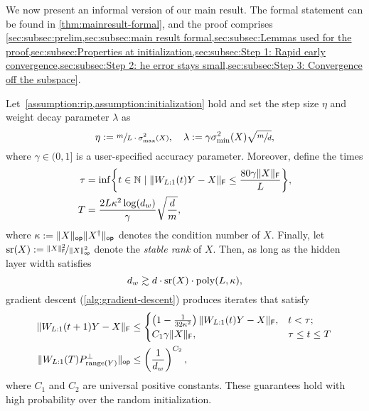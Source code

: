 We now present an informal version of our main result. The formal statement can be found in \cref{thm:mainresult-formal}, and the proof comprises \cref{sec:subsec:prelim,sec:subsec:main result formal,sec:subsec:Lemmas used for the proof,sec:subsec:Properties at initialization,sec:subsec:Step 1: Rapid early convergence,sec:subsec:Step 2: he error stays small,sec:subsec:Step 3: Convergence off the subspace}.
\begin{theorem}[Informal]
	\label{theorem:main-informal}
	Let~\cref{assumption:rip,assumption:initialization} hold and set
	the step size $\eta$ and weight decay parameter $\lambda$ as
	\begin{equation}
		\eta := \sfrac{m}{L \cdot \sigma_{\max}^2(X)}, \quad
		\lambda := \gamma \sigma_{\min}^2(X) \sqrt{\sfrac{m}{d}},
		\label{eq:informal-theorem-stepsize-and-wd}
	\end{equation}
	where $\gamma \in (0, 1]$ is a user-specified accuracy parameter. Moreover, define
	the times
	\begin{subequations}
		\begin{align}
			\tau & = \inf\set*{
				t \in \mathbb{N} \mid
				\frobnorm{W_{L:1}(t)Y - X} \leq
				\frac{80 \gamma \frobnorm{X}}{L}
			},             \label{eq:tau def}                                                            \\
			T    & = \frac{2 L \kappa^2 \log(\dhid)}{\gamma} \sqrt{\frac{\dout}{\din}}, \label{eq:T def}
		\end{align}
	\end{subequations}
	where $\kappa := \lVert X\rVert_{\mathsf{op}} \lVert X^{\dag}\rVert_{\mathsf{op}}$ denotes the condition number  of $X$.
	Finally, let $\operatorname{\mathrm{sr}}(X) := \nicefrac{\lVert X\rVert_{\mathsf{F}}^2}{\lVert X\rVert_{\mathsf{op}}^2}$ denote
	the \emph{stable rank} of $X$.
	Then, as long as the hidden layer width satisfies
	\[
		d_{w} \gtrsim d \cdot \operatorname{\mathrm{sr}}(X) \cdot \mathrm{poly}(L, \kappa),
	\]
	gradient descent (\cref{alg:gradient-descent})
	produces iterates that satisfy
	\begin{align}
		\lVert W_{L:1}(t+1)Y - X\rVert_{\mathsf{F}}
		                                          & \leq
		\begin{cases}
			\left(1 - \frac{1}{32 \kappa^2}\right) \lVert W_{L:1}(t)Y - X\rVert_{\mathsf{F}}, & t < \tau;         \\
			C_1 \gamma \lVert X\rVert_{\mathsf{F}},                                           & \tau \le t \leq T
		\end{cases} \label{eq:thm-regression-error} \\
		\lVert W_{L:1}(T) P_{\mathrm{range}(Y)}^{\perp}\rVert_{\mathsf{op}} & \leq \left( \frac{1}{d_{w}} \right)^{C_{2}},
		\label{eq:thm-generalization-error}
	\end{align}
	where $C_{1}$ and $C_{2}$ are universal positive constants. These guarantees hold with high probability
	over the random initialization.
\end{theorem}
